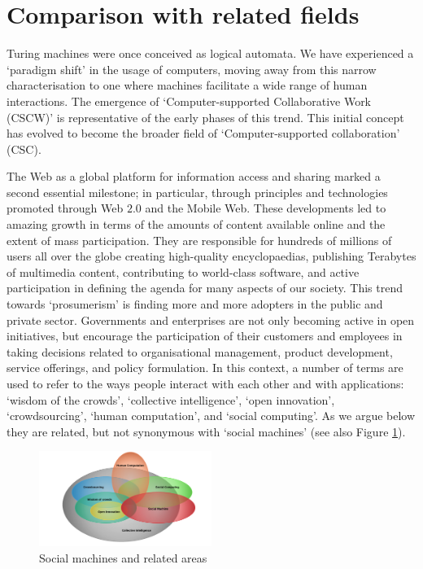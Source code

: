 \documentclass{www13-companion-accepted}
\begin{document}
\section{Comparison with related fields}
\label{sec:comparison}
Turing machines were once conceived as logical automata. We have experienced a `paradigm shift' in the usage of computers, moving away from this narrow characterisation to one where machines facilitate a wide range of human interactions. The emergence of `Computer-supported Collaborative Work (CSCW)' \cite{grudin1994computer} is representative of the early phases of this trend. This initial concept has evolved to become the broader field of `Computer-supported collaboration' (CSC).

The Web as a global platform for information access and sharing marked a second essential milestone; in particular, through principles and technologies promoted through Web $2.0$ and the Mobile Web. These developments led to amazing growth in terms of the amounts of content available online and the extent of mass participation. They are responsible for hundreds of millions of users all over the globe creating high-quality encyclopaedias, publishing Terabytes of multimedia content, contributing to world-class software, and active participation in defining the agenda for many aspects of our society. This trend towards `prosumerism' is finding more and more adopters in the public and private sector. Governments and enterprises are not only becoming active in open initiatives, but encourage the participation of their customers and employees in taking decisions related to organisational management, product development, service offerings, and policy formulation. In this context, a number of terms are used to refer to the ways people interact with each other and with applications: `wisdom of the crowds', `collective intelligence', `open innovation', `crowdsourcing', `human computation', and `social computing'. As we argue below they are related, but not synonymous with `social machines' (see also Figure \ref{fig:socialmachine}).

\begin{figure}[htb]
\begin{center}
\includegraphics[width=0.5\textwidth]{img/Socialmachine1}
\caption{Social machines and related areas} \label{fig:socialmachine}
\end{center}
\end{figure}
\end{document}
